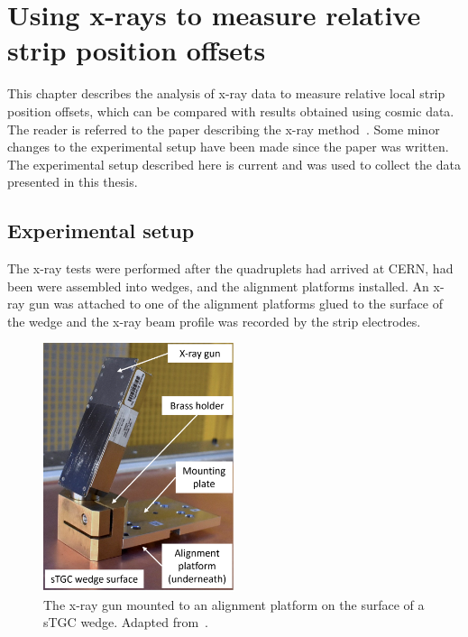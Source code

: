 
\chapter{Using x-rays to measure relative strip position offsets}
\label{chap:xray}

This chapter describes the analysis of x-ray data to measure relative local strip position offsets, which can be compared with results obtained using cosmic data. The reader is referred to the paper describing the x-ray method~\cite{lefebvre_precision_2020}. Some minor changes to the experimental setup have been made since the paper was written. The experimental setup described here is current and was used to collect the data presented in this thesis.

\section{Experimental setup}

The x-ray tests were performed after the quadruplets had arrived at CERN, had been were assembled into wedges, and the alignment platforms installed. An x-ray gun was attached to one of the alignment platforms glued to the surface of the wedge and the x-ray beam profile was recorded by the strip electrodes.

\begin{figure}[t]
    \centering
    \includegraphics[width = 0.5\textwidth]{figures/xray_setup.png}
    \caption{The x-ray gun mounted to an alignment platform on the surface of  a sTGC wedge. Adapted from~\cite{lefebvre_precision_2020}.}
    \label{fig:xray_setup}
\end{figure}

